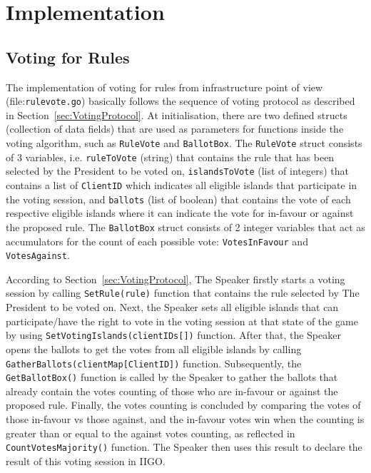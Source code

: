 \section{Implementation}
\label{sec:Implementation}

\subsection{Voting for Rules}
\label{sec:VotingForRules}
The implementation of voting for rules from infrastructure point of view (file:\texttt{rulevote.go}) basically follows the sequence of voting protocol as described in Section~\ref{sec:VotingProtocol}. At initialisation, there are two defined structs (collection of data fields) that are used as parameters for functions inside the voting algorithm, such as \texttt{RuleVote} and \texttt{BallotBox}. The \texttt{RuleVote} struct consists of 3 variables, i.e. \texttt{ruleToVote} (string) that contains the rule that has been selected by the President to be voted on, \texttt{islandsToVote} (list of integers) that contains a list of \texttt{ClientID} which indicates all eligible islands that participate in the voting session, and \texttt{ballots} (list of boolean) that contains the vote of each respective eligible islands where it can indicate the vote for in-favour or against the proposed rule. The \texttt{BallotBox} struct consists of 2 integer variables that act as accumulators for the count of each possible vote: \texttt{VotesInFavour} and \texttt{VotesAgainst}.

According to Section~\ref{sec:VotingProtocol}, The Speaker firstly starts a voting session by calling \texttt{SetRule(rule)} function that contains the rule selected by The President to be voted on. Next, the Speaker sets all eligible islands that can participate/have the right to vote in the voting session at that state of the game by using \texttt{SetVotingIslands(clientIDs[])} function. After that, the Speaker opens the ballots to get the votes from all eligible islands by calling \texttt{GatherBallots(clientMap[ClientID])} function. Subsequently, the \texttt{GetBallotBox()} function is called by the Speaker to gather the ballots that already contain the votes counting of those who are in-favour or against the proposed rule. Finally, the votes counting is concluded by comparing the votes of those in-favour vs those against, and the in-favour votes win when the counting is greater than or equal to the against votes counting, as reflected in \texttt{CountVotesMajority()} function. The Speaker then uses this result to declare the result of this voting session in IIGO.

